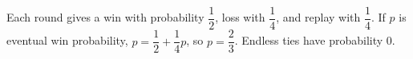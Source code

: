 Each round gives a win with probability $\dfrac{1}{2}$, loss with $\dfrac{1}{4}$, and replay with $\dfrac{1}{4}$. If $p$ is eventual win probability, $p=\dfrac{1}{2}+\dfrac{1}{4}p$, so $\boxed{p=\dfrac{2}{3}}$. Endless ties have probability 0.
